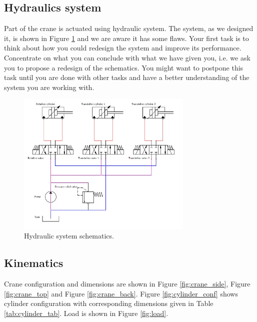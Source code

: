\documentclass{article}
\begin{document}
	\subsection{Hydraulics system}
	
	Part of the crane is actuated using hydraulic system. The system, as we designed it, is shown in Figure \ref{fig:hydraulic} and we are aware it has some flaws. Your first task is to think about how you could redesign the system and improve its performance. Concentrate on what you can conclude with what we have given you, i.e. we ask you to propose a redesign of the schematics. You might want to postpone this task until you are done with other tasks and have a better understanding of the system you are working with.
	
	\begin{figure}[h!]
		\centering
		\includegraphics[width=0.75\textwidth]{hidraulika_shema.jpg}
		\caption{Hydraulic system schematics.}
		\label{fig:hydraulic}
	\end{figure}
	
	\subsection{Kinematics}
	
	Crane configuration and dimensions are shown in Figure \ref{fig:crane_side}, Figure \ref{fig:crane_top} and Figure \ref{fig:crane_back}. Figure \ref{fig:cylinder_conf} shows cylinder configuration with corresponding dimensions given in Table \ref{tab:cylinder_tab}. Load is shown in Figure \ref{fig:load}.
	
\end{document}
